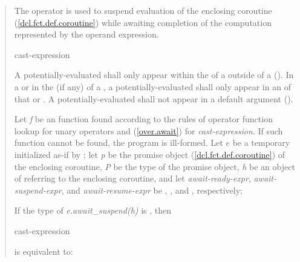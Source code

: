 \begin{quote}
\pnum
The  operator is used to suspend evaluation of the enclosing coroutine (\ref{dcl.fct.def.coroutine}) while awaiting completion of the computation represented by the operand expression.

\begin{bnf}
  \br
   cast-expression
\end{bnf}

\pnum
A potentially-evaluated 
 shall only appear within the  of a  outside of a  ().
%
In a  or in the  (if any) of a , a potentially-evaluated  shall only appear in an  of that  or .
%
%
A potentially-evaluated  shall not appear in a default argument ().

\pnum
Let \textit{f} be an  function found according to the rules of operator function lookup for unary operators and (\ref{over.await}) for \textit{cast-expression}. If such function cannot be found, the program is ill-formed. 
Let $e$ be a temporary initialized as-if by ; let \textit{p} be the promise object (\ref{dcl.fct.def.coroutine})
of the enclosing coroutine, \textit{P} be the type of the promise object, \textit{h} be an object of  referring to the enclosing coroutine, and let \textit{await-ready-expr}, \textit{await-suspend-expr}, and \textit{await-resume-expr} be
, , and , respectively;

If the type of \textit{e.await_suspend(h)} is , then

\begin{ncbnf}
   cast-expression
\end{ncbnf}
is equivalent to:


\end{quote}
